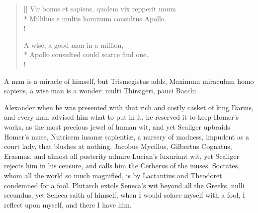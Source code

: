 {\settowidth{\versewidth}{Vir bonus et sapiens, qualem vix repperit unum}
\begin{verse}[\versewidth]
Vir bonus et sapiens, qualem vix repperit unum\\*
Millibus e multis hominum consultus Apollo.\\!

A wise, a good man in a million,\\*
Apollo consulted could scarce find one.\\!
\end{verse}

A man is a miracle of himself, but Trismegistus adds, Maximum miraculum
homo sapiens, a wise man is a wonder: multi Thirsigeri, pauci Bacchi.

Alexander when he was presented with that rich and costly casket of
king Darius, and every man advised him what to put in it, he reserved
it to keep Homer's works, as the most precious jewel of human wit, and
yet  Scaliger upbraids Homer's muse, Nutricem insan\ae{} sapienti\ae{},
a nursery of madness, impudent as a court lady, that blushes at
nothing. Jacobus Mycillus, Gilbertus Cognatus, Erasmus, and almost all
posterity admire Lucian's luxuriant wit, yet Scaliger rejects him in
his censure, and calls him the Cerberus of the muses. Socrates, whom
all the world so much magnified, is by Lactantius and Theodoret
condemned for a fool. Plutarch extols Seneca's wit beyond all the
Greeks, nulli secundus, yet  Seneca saith of himself, when I would
solace myself with a fool, I reflect upon myself, and there I have him.

}
